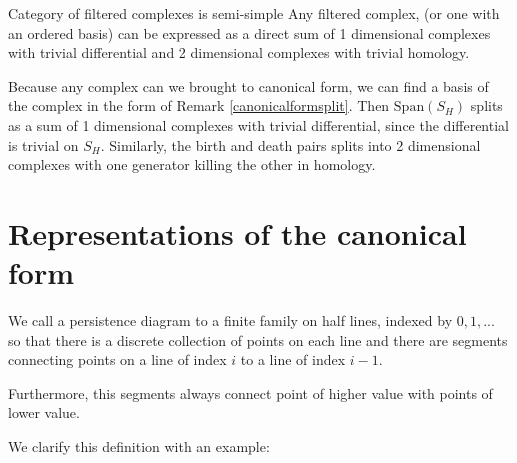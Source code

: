 \begin{corollary}{Category of filtered complexes is semi-simple}
Any filtered complex, (or one with an ordered basis) can be expressed as a direct sum of 
1 dimensional complexes with trivial differential and 2 dimensional complexes with trivial homology.
\end{corollary}

\begin{prof}
Because any complex can we brought to canonical form, we can find a basis of the complex in the form of Remark \ref{canonicalformsplit}.
Then $\text{Span}(S_H)$ splits as a sum of 1 dimensional complexes with trivial differential, since the differential is trivial on $S_H$.
Similarly, the birth and death pairs splits into 2 dimensional complexes with one generator killing the other in homology.

\end{prof}

\section{Representations of the canonical form}

\begin{definition}
We call a persistence diagram to a finite family on half lines, indexed by $0,1,...$
so that there is a discrete collection of points on each line and there are segments connecting points
on a line of index $i$ to a line of index $i-1$.

Furthermore, this segments always connect point of higher value with points of lower value.
\end{definition}

We clarify this definition with an example:

